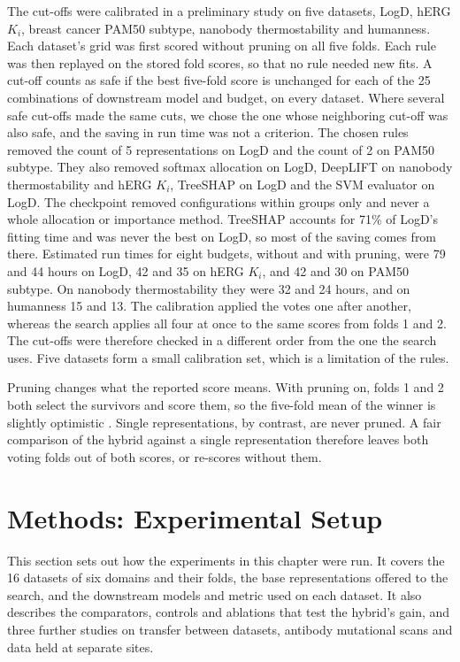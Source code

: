 The cut-offs were calibrated in a preliminary study on five datasets, LogD, hERG $K_i$, breast cancer PAM50 subtype, nanobody thermostability and humanness. Each dataset's grid was first scored without pruning on all five folds. Each rule was then replayed on the stored fold scores, so that no rule needed new fits. A cut-off counts as safe if the best five-fold score is unchanged for each of the 25 combinations of downstream model and budget, on every dataset. Where several safe cut-offs made the same cuts, we chose the one whose neighboring cut-off was also safe, and the saving in run time was not a criterion. The chosen rules removed the count of 5 representations on LogD and the count of 2 on PAM50 subtype. They also removed softmax allocation on LogD, DeepLIFT on nanobody thermostability and hERG $K_i$, TreeSHAP on LogD and the SVM evaluator on LogD. The checkpoint removed configurations within groups only and never a whole allocation or importance method. TreeSHAP accounts for 71\% of LogD's fitting time and was never the best on LogD, so most of the saving comes from there. Estimated run times for eight budgets, without and with pruning, were 79 and 44 hours on LogD, 42 and 35 on hERG $K_i$, and 42 and 30 on PAM50 subtype. On nanobody thermostability they were 32 and 24 hours, and on humanness 15 and 13. The calibration applied the votes one after another, whereas the search applies all four at once to the same scores from folds 1 and 2. The cut-offs were therefore checked in a different order from the one the search uses. Five datasets form a small calibration set, which is a limitation of the rules.

Pruning changes what the reported score means. With pruning on, folds 1 and 2 both select the survivors and score them, so the five-fold mean of the winner is slightly optimistic \citep{Cawley2010}. Single representations, by contrast, are never pruned. A fair comparison of the hybrid against a single representation therefore leaves both voting folds out of both scores, or re-scores without them.

\section{Methods: Experimental Setup}
This section sets out how the experiments in this chapter were run. It covers the 16 datasets of six domains and their folds, the base representations offered to the search, and the downstream models and metric used on each dataset. It also describes the comparators, controls and ablations that test the hybrid's gain, and three further studies on transfer between datasets, antibody mutational scans and data held at separate sites.

